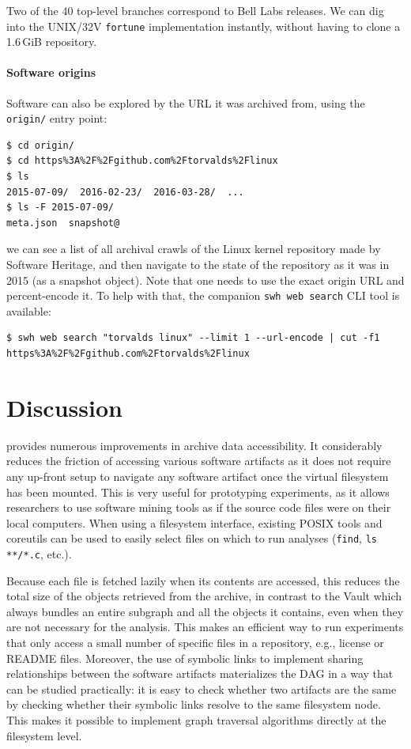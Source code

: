 Two of the 40 top-level branches correspond to Bell Labs releases. We can dig
into the UNIX/32V \texttt{fortune} implementation instantly, without having to
clone a 1.6\,GiB repository.


\paragraph{Software origins}

Software can also be explored by the URL it was archived from, using the
\texttt{origin/} entry point:

\begin{verbatim}
$ cd origin/
$ cd https%3A%2F%2Fgithub.com%2Ftorvalds%2Flinux
$ ls
2015-07-09/  2016-02-23/  2016-03-28/  ...
$ ls -F 2015-07-09/
meta.json  snapshot@
\end{verbatim}

\noindent we can see a list of all archival crawls of the Linux kernel
repository made by Software Heritage, and then navigate to the state of the
repository as it was in 2015 (as a snapshot object). Note that one needs to use
the exact origin URL and percent-encode it. To help with that, the companion
\texttt{swh web search} CLI tool is available:

\begin{verbatim}
$ swh web search "torvalds linux" --limit 1 --url-encode | cut -f1
https%3A%2F%2Fgithub.com%2Ftorvalds%2Flinux
\end{verbatim}


\section{Discussion}

\SWHFS{} provides numerous improvements in archive data accessibility.
It considerably reduces the friction of accessing various software artifacts as
it does not require any up-front setup to navigate any software artifact once
the virtual filesystem has been mounted. This is very useful for prototyping
experiments, as it allows researchers to use software mining tools as if the
source code files were on their local computers. When using a filesystem interface,
existing POSIX tools and coreutils can be used to easily select files on which
to run analyses (\texttt{find}, \texttt{ls **/*.c},
etc.).

Because each file is fetched lazily when its contents are accessed, this
reduces the total size of the objects retrieved from the archive, in contrast
to the Vault which always bundles an entire subgraph and all the objects it
contains, even when they are not necessary for the analysis. This makes
\SWHFS{} an efficient way to run experiments that only access a small number of
specific files in a repository, e.g., license or README files.
Moreover, the use of symbolic links to implement sharing relationships between
the software artifacts materializes the DAG in a way that can be studied
practically: it is easy to check whether two artifacts are the same by
checking whether their symbolic links resolve to the same filesystem node. This
makes it possible to implement graph traversal algorithms directly at the
filesystem level.


